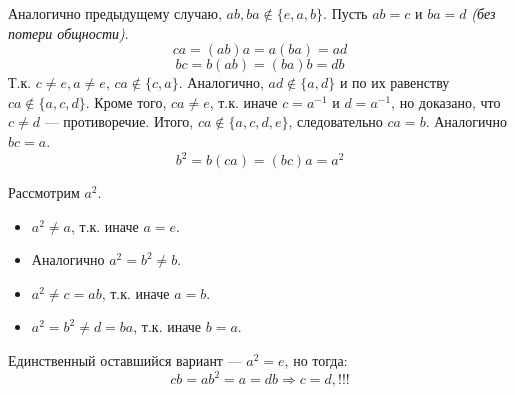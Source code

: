 \begin{solution}
\begin{enumerate}
              Аналогично предыдущему случаю, \(ab, ba \notin \{e, a, b\}\). Пусть \(ab = c\) и \(ba = d\) \textit{(без потери общности)}.
              \[ca = (ab)a = a(ba) = ad\]
              \[bc = b(ab) = (ba)b = db\]
              Т.к. \(c \neq e, a \neq e\), \(ca \notin \{c, a\}\). Аналогично, \(ad \notin \{a, d\}\) и по их равенству \(ca \notin \{a, c, d\}\). Кроме того, \(ca \neq e\), т.к. иначе \(c = a^{-1}\) и \(d = a^{-1}\), но доказано, что \(c \neq d\) --- противоречие. Итого, \(ca \notin \{a, c, d, e\}\), следовательно \(ca = b\). Аналогично \(bc = a\).
              \[b^2 = b(ca) = (bc)a = a^2\]

              Рассмотрим \(a^2\).
              \begin{itemize}
                  \item \(a^2 \neq a\), т.к. иначе \(a = e\).
                  \item Аналогично \(a^2 = b^2 \neq b\).
                  \item \(a^2 \neq c = ab\), т.к. иначе \(a = b\).
                  \item \(a^2 = b^2 \neq d = ba\), т.к. иначе \(b = a\).
              \end{itemize}
              Единственный оставшийся вариант --- \(a^2 = e\), но тогда:
              \[cb = ab^2 = a = db \Rightarrow c = d, !!!\]
    \end{enumerate}
\end{solution}

